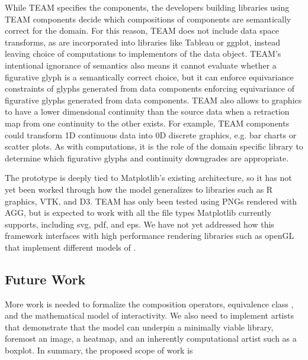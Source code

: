 \documentclass[../main.tex]{subfiles}
\begin{document}
While TEAM specifies the components, the developers building libraries using TEAM components decide which compositions of components are semantically correct for the domain. For this reason, TEAM does not include data space transforms, as are incorporated into libraries like Tableau or ggplot, instead leaving choice of computations to implementors of the data object. TEAM's intentional ignorance of semantics also means it cannot evaluate whether a figurative glyph \cite{byrneAcquiredCodesMeaning2016} is a semantically correct choice, but it can enforce equivariance constraints of glyphs generated from data components enforcing equivariance of figurative glyphs \cite{byrneAcquiredCodesMeaning2016} generated from data components\cite{beckfeathers2014,byrneFigurativeFramesCritical2017}. TEAM also allows to graphics to have a lower dimensional continuity than the source data when a retraction map from one continuity to the other exists. For example, TEAM components could transform 1D continuous data into 0D discrete graphics, e.g. bar charts or scatter plots. As with computations, it is the role of the domain specific library to determine which figurative glyphs and continuity downgrades are appropriate. 

The prototype is deeply tied to Matplotlib's existing architecture, so it has not yet been worked through how the model generalizes to libraries such as R graphics\cite{murrellGraphicsThirdEdition2018}, VTK, and D3. TEAM has only been tested using PNGs rendered with AGG\cite{shemanarevAntiGrainGeometry}, but is expected to work with all the file types Matplotlib currently supports, including svg, pdf, and eps. We have not yet addressed how this framework interfaces with high performance rendering libraries such as openGL\cite{CarsonOpenGL1997} that implement different models of \gsection. 

\subsection{Future Work}
More work is needed to formalize the composition operators, equivalence class \vartisteq, and the mathematical model of interactivity. We also need to implement artists that demonstrate that the model can underpin a minimally viable library, foremost an image\cite{haber1990visualization,hansen2011visualization}, a heatmap\cite{wilkinsonHistoryClusterHeat2009,loua1873atlas}, and an inherently computational artist such as a boxplot\cite{wickham40YearsBoxplots2011}. In summary, the proposed scope of work is
\end{document}
